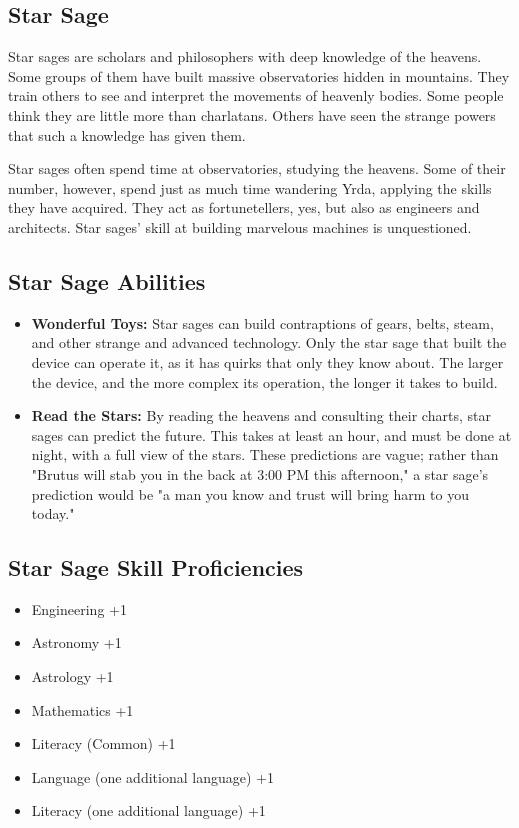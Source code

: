 \begin{multicols}{2}
\section{Star Sage}

Star sages are scholars and philosophers with deep knowledge of the heavens.
Some groups of them have built massive observatories hidden in mountains. They
train others to see and interpret the movements of heavenly bodies. Some people
think they are little more than charlatans. Others have seen the strange powers
that such a knowledge has given them.

Star sages often spend time at observatories, studying the heavens. Some of their
number, however, spend just as much time wandering Yrda, applying the skills they
have acquired. They act as fortunetellers, yes, but also as engineers and architects.
Star sages' skill at building marvelous machines is unquestioned.

\subsection{Star Sage Abilities}

\begin{itemize}
    \item \textbf{Wonderful Toys:} Star sages can build contraptions of gears, belts,
    steam, and other strange and advanced technology. Only the star sage that built
    the device can operate it, as it has quirks that only they know about. The larger
    the device, and the more complex its operation, the longer it takes to build.
    \item \textbf{Read the Stars:} By reading the heavens and consulting their charts,
    star sages can predict the future. This takes at least an hour, and must be done
    at night, with a full view of the stars. These predictions are vague; rather than
    "Brutus will stab you in the back at 3:00 PM this afternoon," a star sage's prediction
    would be "a man you know and trust will bring harm to you today."
\end{itemize}

\subsection{Star Sage Skill Proficiencies}

\begin{itemize}
    \item Engineering +1
    \item Astronomy +1
    \item Astrology +1
    \item Mathematics +1
    \item Literacy (Common) +1
    \item Language (one additional language) +1
    \item Literacy (one additional language) +1
\end{itemize}


\end{multicols}
